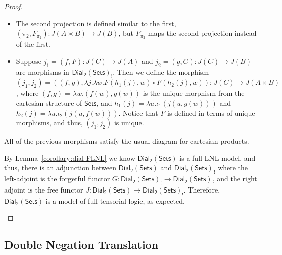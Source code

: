 \documentclass{elsarticle}
\newcommand{\dial}[0]{\mathsf{Dial_2}(\mathsf{Sets})}
\newcommand{\sets}[0]{\mathsf{Sets}}
\begin{document}
\begin{proof}
\begin{report}
\begin{itemize}
\begin{itemize}
    \item The second projection is defined similar to the first,
      $(\pi_2, F_{\pi_2}) : J(A \times B) \to J(B)$, but $F_{\pi_2}$ maps
      the second projection instead of the first.

    \item Suppose $j_1 = (f , F) : J(C) \to J(A)$ and $j_2 = (g , G) : J(C) \to
      J(B)$ are morphisms in $\dial_!$.  Then we define the morphism
      $(j_1, j_2) = ((f,g),\lambda j.\lambda w.F(h_1(j),w) \circ F(h_2(j),w))
      : J(C) \to J(A \times B)$, where $(f,g) = \lambda w.(f(w),g(w))$ is the unique morphism
      from the cartesian structure of $\sets$, and
      $h_1(j) = \lambda u.\iota_1(j(u,g(w)))$ and
      $h_2(j) = \lambda u.\iota_2(j(u,f(w)))$.
      Notice that $F$ is defined in terms of unique morphisms, and thus,
      $(j_1,j_2)$ is unique.
    \end{itemize}
    All of the previous morphisms satisfy the usual diagram for
    cartesian products.    
  \end{itemize}

  By Lemma~\ref{corollary:dial-FLNL} we know $\dial$ is a full LNL
  model, and thus, there is an adjunction between $\dial$ and
  $\dial_!$ where the left-adjoint is the forgetful functor $G :
  \dial_! \to \dial$, and the right adjoint is the free functor $J :
  \dial \to \dial_!$.  Therefore, $\dial$ is a model of full tensorial
  logic, as expected.
  \end{report}
\end{proof}

\subsection{Double Negation Translation}
\label{subsec:a_negative_translation_of_linear_logic_into_fill_using_tensorial_negation}
\end{document}
